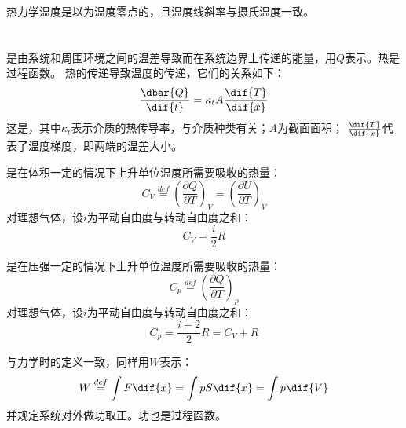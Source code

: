             热力学温度是以为温度零点的，且温度线斜率与摄氏温度一致。
    \section[热力学第一定律]{}
        \subsection[热与功]{}
            \begin{Itemize}
                \item {}是由系统和周围环境之间的温差导致而在系统边界上传递的能量，用$Q$表示。热是过程函数。
                热的传递导致温度的传递，它们的关系如下：
                \begin{equation}
                    \frac{\dbar{Q}}{\dif{t}} = \kappa_{t}A\frac{\dif{T}}{\dif{x}}
                \end{equation}
                这是，其中$\kappa_{t}$表示介质的热传导率，与介质种类有关；$A$为截面面积；
                $\frac{\dif{T}}{\dif{x}}$代表了温度梯度，即两端的温差大小。
                \item {}是在体积一定的情况下上升单位温度所需要吸收的热量：
                \begin{equation}
                    C_{V} \overset{def}{=} \left(\frac{\partial{Q}}{\partial{T}}\right)_{V} = \left(\frac{\partial{U}}{\partial{T}}\right)_{V}
                    \nonumber
                \end{equation}
                对理想气体，设$i$为平动自由度与转动自由度之和：
                \begin{equation}
                    C_{V} = \frac{i}{2}R
                    \nonumber
                \end{equation}
                \item {}是在压强一定的情况下上升单位温度所需要吸收的热量：
                \begin{equation}
                    C_{p} \overset{def}{=} \left(\frac{\partial{Q}}{\partial{T}}\right)_{p} %
                    \nonumber
                \end{equation}
                对理想气体，设$i$为平动自由度与转动自由度之和：
                \begin{equation}
                    C_{p} = \frac{i+2}{2}R = C_{V}+R
                    \nonumber
                \end{equation}
                \item {}与力学时的定义一致，同样用$W$表示：
                \begin{equation}
                    W \overset{def}{=} \int F\dif{x} = \int pS\dif{x} = \int p\dif{V}
                    \nonumber
                \end{equation}
                并规定系统对外做功取正。功也是过程函数。                
            \end{Itemize}

